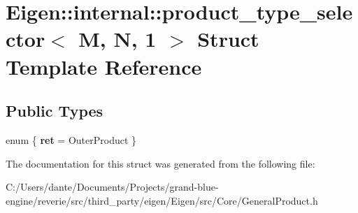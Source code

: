 \hypertarget{struct_eigen_1_1internal_1_1product__type__selector_3_01_m_00_01_n_00_011_01_4}{}\section{Eigen\+::internal\+::product\+\_\+type\+\_\+selector$<$ M, N, 1 $>$ Struct Template Reference}
\label{struct_eigen_1_1internal_1_1product__type__selector_3_01_m_00_01_n_00_011_01_4}
\subsection*{Public Types}
\begin{DoxyCompactItemize}
\item 
\mbox{\label{struct_eigen_1_1internal_1_1product__type__selector_3_01_m_00_01_n_00_011_01_4_a03933e941e7c7c3bd96bb19655f36a98}} 
enum \{ {\bfseries ret} = Outer\+Product
 \}
\end{DoxyCompactItemize}


The documentation for this struct was generated from the following file\+:\begin{DoxyCompactItemize}
\item 
C\+:/\+Users/dante/\+Documents/\+Projects/grand-\/blue-\/engine/reverie/src/third\+\_\+party/eigen/\+Eigen/src/\+Core/General\+Product.\+h\end{DoxyCompactItemize}
